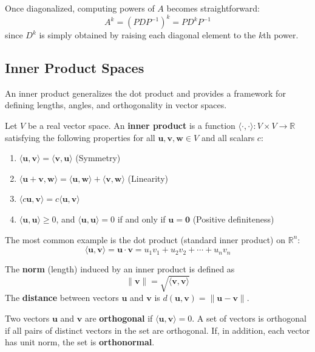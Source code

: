 \documentclass[oneside]{book}
\begin{document}
Once diagonalized, computing powers of $A$ becomes straightforward:
\[
A^k = (PDP^{-1})^k = PD^k P^{-1}
\]
since $D^k$ is simply obtained by raising each diagonal element to the $k$th power.

\subsection{Inner Product Spaces}

An inner product generalizes the dot product and provides a framework for defining lengths, angles, and orthogonality in vector spaces.

\begin{definition}
Let $V$ be a real vector space. An \textbf{inner product} is a function $\langle \cdot, \cdot \rangle: V \times V \to \mathbb{R}$ satisfying the following properties for all $\mathbf{u}, \mathbf{v}, \mathbf{w} \in V$ and all scalars $c$:
\begin{enumerate}
    \item $\langle \mathbf{u}, \mathbf{v} \rangle = \langle \mathbf{v}, \mathbf{u} \rangle$ (Symmetry)
    \item $\langle \mathbf{u} + \mathbf{v}, \mathbf{w} \rangle = \langle \mathbf{u}, \mathbf{w} \rangle + \langle \mathbf{v}, \mathbf{w} \rangle$ (Linearity)
    \item $\langle c\mathbf{u}, \mathbf{v} \rangle = c\langle \mathbf{u}, \mathbf{v} \rangle$
    \item $\langle \mathbf{u}, \mathbf{u} \rangle \ge 0$, and $\langle \mathbf{u}, \mathbf{u} \rangle = 0$ if and only if $\mathbf{u} = \mathbf{0}$ (Positive definiteness)
\end{enumerate}
\end{definition}

The most common example is the dot product (standard inner product) on $\mathbb{R}^n$:
\[
\langle \mathbf{u}, \mathbf{v} \rangle = \mathbf{u} \cdot \mathbf{v} = u_1 v_1 + u_2 v_2 + \cdots + u_n v_n
\]

\begin{definition}
The \textbf{norm} (length) induced by an inner product is defined as
\[
\|\mathbf{v}\| = \sqrt{\langle \mathbf{v}, \mathbf{v} \rangle}
\]
The \textbf{distance} between vectors $\mathbf{u}$ and $\mathbf{v}$ is $d(\mathbf{u}, \mathbf{v}) = \|\mathbf{u} - \mathbf{v}\|$.
\end{definition}

\begin{definition}[Orthogonality]
Two vectors $\mathbf{u}$ and $\mathbf{v}$ are \textbf{orthogonal} if $\langle \mathbf{u}, \mathbf{v} \rangle = 0$. A set of vectors is orthogonal if all pairs of distinct vectors in the set are orthogonal. If, in addition, each vector has unit norm, the set is \textbf{orthonormal}.
\end{definition}
\end{document}
